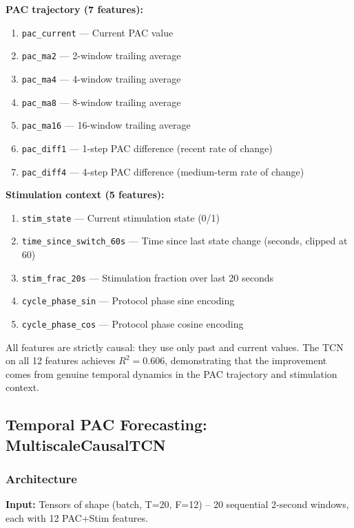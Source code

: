 \documentclass[11pt,letterpaper]{article}
\begin{document}
\textbf{PAC trajectory (7 features):}
\begin{enumerate}[nosep]
  \item \texttt{pac\_current} --- Current PAC value
  \item \texttt{pac\_ma2} --- 2-window trailing average
  \item \texttt{pac\_ma4} --- 4-window trailing average
  \item \texttt{pac\_ma8} --- 8-window trailing average
  \item \texttt{pac\_ma16} --- 16-window trailing average
  \item \texttt{pac\_diff1} --- 1-step PAC difference (recent rate of change)
  \item \texttt{pac\_diff4} --- 4-step PAC difference (medium-term rate of change)
\end{enumerate}

\textbf{Stimulation context (5 features):}
\begin{enumerate}[nosep, start=8]
  \item \texttt{stim\_state} --- Current stimulation state (0/1)
  \item \texttt{time\_since\_switch\_60s} --- Time since last state change (seconds, clipped at 60)
  \item \texttt{stim\_frac\_20s} --- Stimulation fraction over last 20 seconds
  \item \texttt{cycle\_phase\_sin} --- Protocol phase sine encoding
  \item \texttt{cycle\_phase\_cos} --- Protocol phase cosine encoding
\end{enumerate}

All features are strictly causal: they use only past and current values. The TCN on all 12 features achieves $R^2 = 0.606$, demonstrating that the improvement comes from genuine temporal dynamics in the PAC trajectory and stimulation context.

\subsection{Temporal PAC Forecasting: MultiscaleCausalTCN}

\subsubsection{Architecture}

\textbf{Input:} Tensors of shape (batch, T=20, F=12) -- 20 sequential 2-second windows, each with 12 PAC+Stim features.
\end{document}
